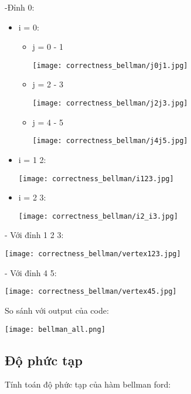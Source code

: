 \documentclass[a4paper]{article}
\begin{document}
-Đỉnh 0:

\begin{itemize}
    \item i = 0:
    \begin{itemize}
        \item j = 0 - 1
            \begin{center}
                \texttt{[image: correctness\_bellman/j0j1.jpg]}
            \end{center}
        \item j = 2 - 3
            \begin{center}
                \texttt{[image: correctness\_bellman/j2j3.jpg]}
            \end{center}
        \item j = 4 - 5
            \begin{center}
                \texttt{[image: correctness\_bellman/j4j5.jpg]}
            \end{center}
    \end{itemize}
    \item i = 1 2:
    \begin{center}
        \texttt{[image: correctness\_bellman/i123.jpg]}
    \end{center}
    \item i = 2 3:
    \begin{center}
        \texttt{[image: correctness\_bellman/i2\_i3.jpg]}
    \end{center}
\end{itemize}

- Với đỉnh 1 2 3:
\begin{center}
    \texttt{[image: correctness\_bellman/vertex123.jpg]}
\end{center}

- Với đỉnh 4 5:
\begin{center}
    \texttt{[image: correctness\_bellman/vertex45.jpg]}
\end{center}

So sánh với output của code:

\begin{center}
    \texttt{[image: bellman\_all.png]}
\end{center}
\subsection{Độ phức tạp}
Tính toán độ phức tạp của hàm bellman ford:
\end{document}
